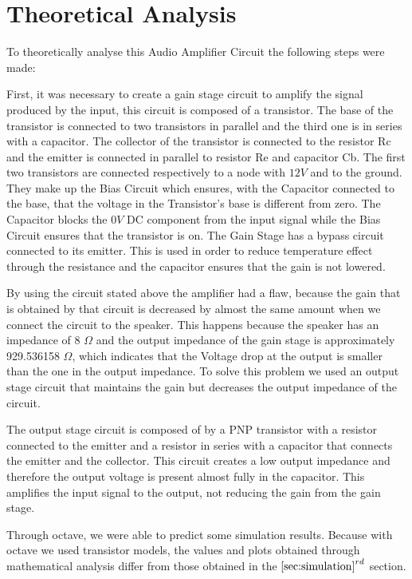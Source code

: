 
\section{Theoretical Analysis}
\label{sec:analysis}

To theoretically analyse this Audio Amplifier Circuit the following steps were made:
\par
\par
First, it was necessary to create a gain stage circuit to amplify the signal produced by the input, this circuit is composed of a transistor. The base of the transistor is connected to two transistors in parallel and the third one is in series with a capacitor. The collector of the transistor is connected to the resistor Rc and the emitter is connected in parallel to resistor Re and capacitor Cb. The first two transistors are connected respectively to a node with $12V$ and to the ground. They make up the Bias Circuit which ensures, with the Capacitor connected to the base, that the voltage in the Transistor's base is different from zero. The Capacitor blocks the $0V$ DC component from the input signal while the Bias Circuit ensures that the transistor is on.
The Gain Stage has a bypass circuit connected to its emitter. This is used in order to reduce temperature effect through the resistance and the capacitor ensures that the gain is not lowered.
\par
\par
By using the circuit stated above the amplifier had a flaw, because the gain that is obtained by that circuit is decreased by almost the same amount when we connect the circuit to the speaker. This happens because the speaker has an impedance of 8 $\Omega$ and the output impedance of the gain stage is approximately 929.536158 $\Omega$, which indicates that the Voltage drop at the output is smaller than the one in the output impedance. To solve this problem we used an output stage circuit that maintains the gain but decreases the output impedance of the circuit. 

The output stage circuit is composed of by a PNP transistor with a resistor connected to the emitter and a resistor in series with a capacitor that connects the emitter and the collector. This circuit creates a low output impedance and therefore the output voltage is present almost fully in the capacitor. This amplifies the input signal to the output, not reducing the gain from the gain stage.

Through octave, we were able to predict some simulation results. Because with octave we used transistor models, the values and plots obtained through mathematical analysis differ from those obtained in the $\ref{sec:simulation}^{rd}$ section.

